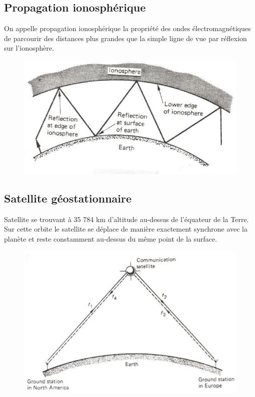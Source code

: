 \documentclass[12pt]{article}
\begin{document}
\subsection{Propagation ionosphérique}

On appelle propagation ionosphérique la propriété des ondes électromagnétiques de parcourir des distances plus grandes que la simple ligne de vue par réflexion sur l’ionosphère.

\begin{figure}[H]
\centering
\includegraphics[scale=0.4]{images/PropagationIono.png}
\end{figure}

\subsection{Satellite géostationnaire}

Satellite se trouvant à 35 784 km d'altitude au-dessus de l'équateur de la Terre. Sur cette orbite le satellite se déplace de manière exactement synchrone avec la planète et reste constamment au-dessus du même point de la surface.

\begin{figure}[H]
\centering
\includegraphics[scale=0.4]{images/SatelliteGeo.png}
\end{figure}
\end{document}
